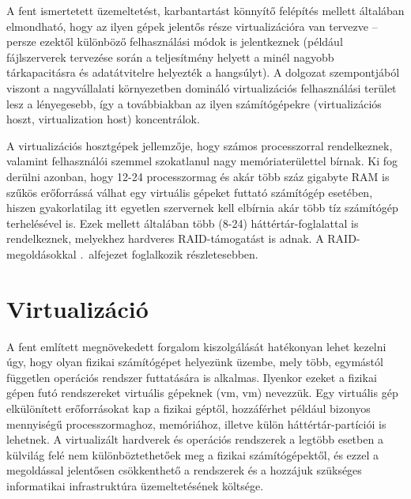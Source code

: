 A fent ismertetett üzemeltetést, karbantartást könnyítő felépítés mellett általában elmondható, hogy az ilyen gépek jelentős része virtualizációra van tervezve -- persze ezektől különböző felhasználási módok is jelentkeznek (például fájlszerverek tervezése során a teljesítmény helyett a minél nagyobb tárkapacitásra és adatátvitelre helyezték a hangsúlyt). A dolgozat szempontjából viszont a nagyvállalati környezetben domináló virtualizációs felhasználási terület lesz a lényegesebb, így a továbbiakban az ilyen számítógépekre (virtualizációs hoszt, virtualization host) koncentrálok.

A virtualizációs hosztgépek jellemzője, hogy számos processzorral rendelkeznek, valamint felhasználói szemmel szokatlanul nagy memóriaterülettel bírnak. Ki fog derülni azonban, hogy 12-24 processzormag és akár több száz gigabyte RAM is szűkös erőforrássá válhat egy virtuális gépeket futtató számítógép esetében, hiszen gyakorlatilag itt egyetlen szervernek kell elbírnia akár több tíz számítógép terhelésével is. Ezek mellett általában több (8-24) háttértár-foglalattal is rendelkeznek, melyekhez hardveres RAID-támogatást is adnak. A RAID-megoldásokkal .~alfejezet foglalkozik részletesebben.

\section{Virtualizáció}
A fent említett megnövekedett forgalom kiszolgálását hatékonyan lehet kezelni úgy, hogy olyan fizikai számítógépet helyezünk üzembe, mely  több, egymástól független operációs rendszer futtatására is alkalmas. Ilyenkor ezeket a fizikai gépen futó rendszereket virtuális gépeknek (\acrlong{vm}, \acrshort{vm}) nevezzük. Egy virtuális gép elkülönített erőforrásokat kap a fizikai géptől, hozzáférhet például bizonyos mennyiségű processzormaghoz, memóriához, illetve külön háttértár-partíciói is lehetnek. A virtualizált hardverek és operációs rendszerek a legtöbb esetben a külvilág felé nem különböztethetőek meg a fizikai számítógépektől, és ezzel a megoldással jelentősen csökkenthető a rendszerek és a hozzájuk szükséges informatikai infrastruktúra üzemeltetésének költsége.

